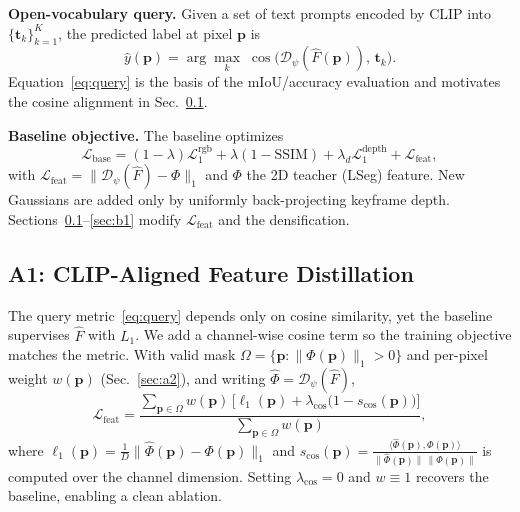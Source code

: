 \documentclass[10pt, journal]{IEEEtran}
\begin{document}
\textbf{Open-vocabulary query.} Given a set of text prompts encoded by CLIP into
$\{\mathbf{t}_k\}_{k=1}^{K}$, the predicted label at pixel $\mathbf{p}$ is
\begin{equation}
\hat{y}(\mathbf{p}) = \arg\max_{k}\; \cos\!\big(\mathcal{D}_\psi(\hat{F}(\mathbf{p})),\, \mathbf{t}_k\big).
\label{eq:query}
\end{equation}
Equation~\eqref{eq:query} is the basis of the mIoU/accuracy evaluation and
motivates the cosine alignment in Sec.~\ref{sec:a1}.

\textbf{Baseline objective.} The baseline optimizes
\begin{equation}
\mathcal{L}_{\text{base}} = (1\!-\!\lambda)\mathcal{L}_1^{\text{rgb}} + \lambda(1\!-\!\text{SSIM}) + \lambda_d \mathcal{L}_1^{\text{depth}} + \mathcal{L}_{\text{feat}},
\label{eq:base}
\end{equation}
with $\mathcal{L}_{\text{feat}}\!=\!\|\mathcal{D}_\psi(\hat{F})\!-\!\Phi\|_1$ and
$\Phi$ the 2D teacher (LSeg) feature. New Gaussians are added only by uniformly
back-projecting keyframe depth. Sections~\ref{sec:a1}--\ref{sec:b1} modify
$\mathcal{L}_{\text{feat}}$ and the densification.

\subsection{A1: CLIP-Aligned Feature Distillation}\label{sec:a1}
The query metric~\eqref{eq:query} depends only on cosine similarity, yet the
baseline supervises $\hat{F}$ with $L_1$. We add a channel-wise cosine term so the
training objective matches the metric. With valid mask
$\Omega=\{\mathbf{p}: \|\Phi(\mathbf{p})\|_1\!>\!0\}$ and per-pixel weight
$w(\mathbf{p})$ (Sec.~\ref{sec:a2}), and writing $\hat{\Phi}=\mathcal{D}_\psi(\hat{F})$,
\begin{equation}
\mathcal{L}_{\text{feat}} = \frac{\sum_{\mathbf{p}\in\Omega} w(\mathbf{p})\,\Big[ \ell_1(\mathbf{p}) + \lambda_{\cos}\big(1 - s_{\cos}(\mathbf{p})\big)\Big]}{\sum_{\mathbf{p}\in\Omega} w(\mathbf{p})},
\label{eq:a1}
\end{equation}
where $\ell_1(\mathbf{p})=\tfrac{1}{D}\|\hat{\Phi}(\mathbf{p})-\Phi(\mathbf{p})\|_1$
and $s_{\cos}(\mathbf{p})=\frac{\langle\hat{\Phi}(\mathbf{p}),\Phi(\mathbf{p})\rangle}{\|\hat{\Phi}(\mathbf{p})\|\,\|\Phi(\mathbf{p})\|}$
is computed over the channel dimension. Setting $\lambda_{\cos}\!=\!0$ and
$w\!\equiv\!1$ recovers the baseline, enabling a clean ablation.
\end{document}
